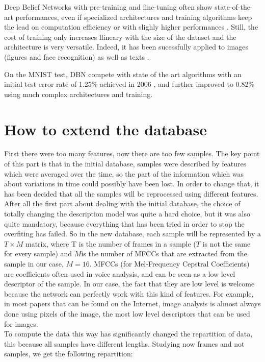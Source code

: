 \documentclass{report}
\begin{document}
	Deep Belief Networks with pre-training and fine-tuning often show 
	state-of-the-art performances, even if specialized architectures and training 
	algorithms keep the lead on computation efficiency or with slighly higher 
	performances \cite{ranzato2008semi}. Still, the cost of training only increases 
	llineary with the size of the dataset and the architecture is very versatile. 
	Indeed, it has been sucessfully applied to images (figures and face 
	recognition) as well as texts \cite{hinton2006reducing}.
	
	On the MNIST test, DBN compete with state of the art algorithms with an initial 
	test error rate of 1.25\% achieved in 2006 
	\cite{hinton2006fast}, and further improved to 0.82\% 
	\cite{lee2009convolutional} using  much complex architectures and training.
	
	\section{How to extend the database}
	
	First there were too many features, now there are too few samples. The key point of this part is that in the initial database, samples were described by features which were averaged over the time, so the part of the information which was about variations in time could possibly have been lost. In order to change that, it has been decided that all the samples will be reprocessed using different features. After all the first part about dealing with the initial database, the choice of totally changing the description model was quite a hard choice, but it was also quite mandatory, because everything that has been tried in order to stop the overfiting has failed. So in the new database, each sample will be represented by a $T \times M$ matrix, where T is the number of frames in a sample ($T$ is not the same for every sample) and $M $is the number of MFCCs that are extracted from the sample in our case, $M = 16$. MFCCs (for Mel-Frequency Cepstral Coefficients) are coefficients often used in voice analysis, and can be seen as a low level descriptor of the sample. In our case, the fact that they are low level is welcome because the network can perfectly work with this kind of features. For example, in most papers that can be found on the Internet, image analysis is almost always done using pixels of the image, the most low level descriptors that can be used for images.\\
	
	To compute the data this way has significantly changed the repartition of data, this because all samples have different lengths. Studying now frames and not samples, we get the following repartition:
	
\end{document}
